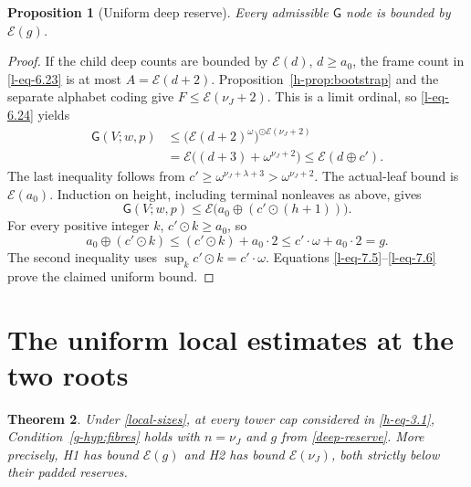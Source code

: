 \documentclass[11pt]{article}
\newtheorem{theorem}{Theorem}[section]
\newtheorem{proposition}[theorem]{Proposition}
\theoremstyle{definition}
\theoremstyle{remark}
\newcommand{\hs}{\mathbin{\oplus}}
\newcommand{\od}{\mathbin{\odot}}
\newcommand{\EE}{\mathcal E}
\newcommand{\GG}{\mathsf G}
\numberwithin{equation}{section}
\begin{document}
\begin{proposition}[Uniform deep reserve]\label{l-prop:deep}
Every admissible $\GG$ node is bounded by $\EE(g)$.
\end{proposition}
\begin{proof}
If the child deep counts are bounded by $\EE(d)$, $d\ge a_0$,
the frame count in \eqref{l-eq-6.23} is at most $A=\EE(d+2)$.
Proposition~\ref{h-prop:bootstrap} and the separate alphabet coding
give $F\le\EE(\nu_J+2)$.
This is a limit ordinal, so \eqref{l-eq-6.24} yields
\begin{equation}
 \begin{aligned}
 \GG(V;w,p)
 &\le \bigl(\EE(d+2)^\omega\bigr)^{\od\EE(\nu_J+2)}\\
 &=\EE\bigl((d+3)+\omega^{\nu_J+2}\bigr)
 \le\EE(d\hs c').
 \end{aligned}
 \label{l-eq-7.4}
\end{equation}
The last inequality follows from
$c'\ge\omega^{\nu_J+\lambda+3}>\omega^{\nu_J+2}$.
The actual-leaf bound is $\EE(a_0)$.
Induction on height, including terminal nonleaves as above, gives
\begin{equation}
 \GG(V;w,p)\le
       \EE\bigl(a_0\hs(c'\od(h+1))\bigr).
 \label{l-eq-7.5}
\end{equation}
For every positive integer $k$, $c'\od k\ge a_0$, so
\begin{equation}
 a_0\hs(c'\od k)\le(c'\od k)+a_0\cdot2
                         \le c'\cdot\omega+a_0\cdot2=g.
 \label{l-eq-7.6}
\end{equation}
The second inequality uses
$\sup_k c'\od k=c'\cdot\omega$.
Equations \eqref{l-eq-7.5}--\eqref{l-eq-7.6} prove the claimed uniform bound.
\end{proof}




\section{The uniform local estimates at the two roots}
\begin{theorem}\label{local-roots}
Under \eqref{local-sizes}, at every tower cap considered in
\eqref{h-eq-3.1}, Condition~\ref{g-hyp:fibres} holds with
$n=\nu_J$ and $g$ from \eqref{deep-reserve}.
More precisely, H1 has bound $\EE(g)$ and H2 has bound
$\EE(\nu_J)$, both strictly below their padded reserves.
\end{theorem}
\end{document}
